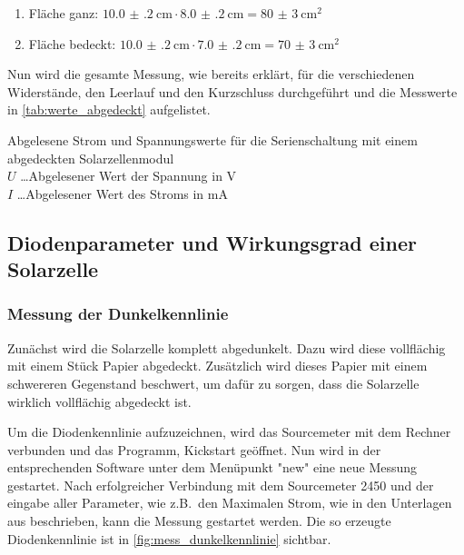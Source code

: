 \documentclass[12pt,english,ngerman]{scrartcl}
\begin{document}
\begin{enumerate}
	\item Fläche ganz: $\SI{10.0(2)}{\cm}\cdot \SI{8.0(2)}{\cm}=\SI{80(3)}{\cm\squared}$
	\item Fläche bedeckt: $\SI{10.0(2)}{\cm}\cdot
		      \SI{7.0(2)}{\cm}=\SI{70(3)}{\cm\squared}$\label{list:flaechenSolar1}
\end{enumerate}

Nun wird die gesamte Messung, wie bereits erklärt, für die verschiedenen
Widerstände, den Leerlauf und den Kurzschluss durchgeführt und die Messwerte in
\autoref{tab:werte_abgedeckt} aufgelistet.

\begin{table}[H]
	\caption[Abgelesene Strom und Spannungswerte für die Serienschaltung mit einem
		abgedeckten Solarzellenmodul] {Abgelesene Strom und Spannungswerte für die
		Serienschaltung mit einem abgedeckten Solarzellenmodul \\
		$U$ \dots Abgelesener Wert der Spannung in V           \\
		$I$ \dots Abgelesener Wert des Stroms in mA
	}\label{tab:werte_abgedeckt}
	\centering
	
\end{table}

\subsection{Diodenparameter und Wirkungsgrad einer Solarzelle}

\subsubsection{Messung der Dunkelkennlinie}

Zunächst wird die Solarzelle komplett abgedunkelt. Dazu wird diese vollflächig
mit einem Stück Papier abgedeckt. Zusätzlich wird dieses Papier mit einem
schwereren Gegenstand beschwert, um dafür zu sorgen, dass die Solarzelle
wirklich vollflächig abgedeckt ist.

Um die Diodenkennlinie aufzuzeichnen, wird das Sourcemeter mit dem Rechner
verbunden und das Programm, Kickstart geöffnet. Nun wird in der entsprechenden
Software unter dem Menüpunkt "new" eine neue Messung gestartet. Nach
erfolgreicher Verbindung mit dem Sourcemeter 2450 und der eingabe aller
Parameter, wie z.B.\ den Maximalen Strom, wie in den Unterlagen aus
\cite{knoll_solarzelle_nodate} beschrieben, kann die Messung gestartet werden.
Die so erzeugte Diodenkennlinie ist in \autoref{fig:mess_dunkelkennlinie}
sichtbar.
\end{document}
